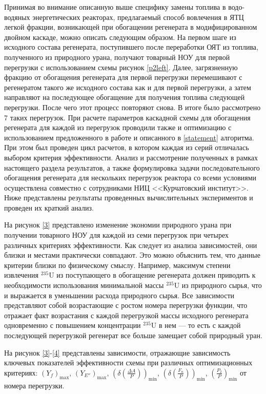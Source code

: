 Принимая во внимание описанную выше специфику замены топлива в водо-водяных энергетических реакторах, предлагаемый способ вовлечения в ЯТЦ легкой фракции, возникающей при обогащении регенерата в модифицированном двойном каскаде, можно описать следующим образом. На первом шаге из исходного состава регенерата, поступившего после переработки ОЯТ из топлива, полученного из природного урана, получают товарный НОУ для первой перегрузки с использованием схемы рисунок \ref{p2left}. Далее, загрязненную фракцию от обогащения регенерата для первой перегрузки перемешивают с регенератом такого же исходного состава как и для первой перегрузки, а затем направляют на последующее обогащение для получения топлива следующей перегрузки. После чего этот процесс повторяют снова. В итоге было рассмотрено 7 таких перегрузок. При расчете параметров каскадной схемы для обогащения регенерата для каждой из перегрузок проводили также и оптимизацию с использованием предложенного в работе и описанного в \ref{statement} алгоритма. При этом был проведен цикл расчетов, в котором каждая из серий отличалась выбором критерия эффективности. Анализ и рассмотрение полученных в рамках настоящего раздела результатов, а также формулировка задачи последовательного обогащения регенерата для нескольких перегрузок реактора со всеми условиями осуществлена совместно с сотрудниками НИЦ <<Курчатовский институт>>. Ниже представлены результаты проведенных вычислительных экспериментов и проведен их краткий анализ.

На рисунок \ref{3} представлено изменение экономии природного урана при получении товарного НОУ для каждой из семи перегрузок при четырех различных критериях эффективности. Как следует из анализа зависимостей, они близки и местами практически совпадают. Это можно объяснить тем, что данные критерии близки по физическому смыслу. Например, максимум степени извлечения $^{235}$U из поступающего в обогащение регенерата должен приводить к необходимости использования минимальной массы $^{235}$U из природного сырья, что и выражается в уменьшении расхода природного сырья. Все зависимости представляют собой возрастающие с ростом номера перегрузки функции, что отражает факт возрастания с каждой перегрузкой массы исходного регенерата одновременно с повышением концентрации $^{235}$U в нем --- то есть с каждой последующей перегрузкой регенерат все больше замещает собой природный уран.

На рисунок \ref{3}-\ref{4} представлены зависимости, отражающие зависимость ключевых показателей эффективности схемы при различных оптимизационных критериях: $(Y_f)_\text{max}$, $(Y_{E''})_\text{max}$, $(\delta(\frac{\Delta A}{P}))_\text{min}$, $(\delta(\frac{F_n}{P}))_\text{min}$, $(\frac{P_2}{P})_\text{min}$ от номера перегрузки.

